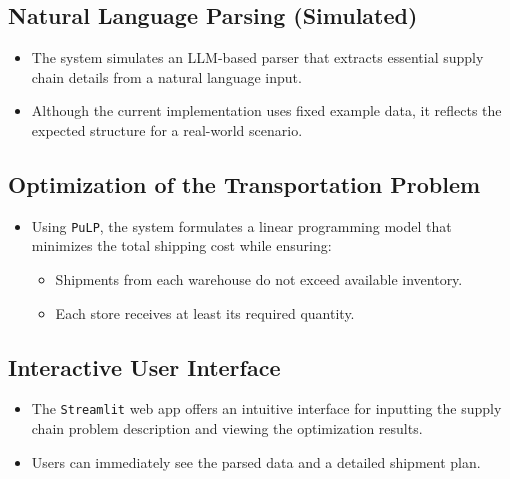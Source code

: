 \documentclass[11pt]{article}
\begin{document}
\subsection*{Natural Language Parsing (Simulated)}
\begin{itemize}
    \item The system simulates an LLM-based parser that extracts essential supply chain details from a natural language input.
    \item Although the current implementation uses fixed example data, it reflects the expected structure for a real-world scenario.
\end{itemize}

\subsection*{Optimization of the Transportation Problem}
\begin{itemize}
    \item Using \texttt{PuLP}, the system formulates a linear programming model that minimizes the total shipping cost while ensuring:
    \begin{itemize}
        \item Shipments from each warehouse do not exceed available inventory.
        \item Each store receives at least its required quantity.
    \end{itemize}
\end{itemize}

\subsection*{Interactive User Interface}
\begin{itemize}
    \item The \texttt{Streamlit} web app offers an intuitive interface for inputting the supply chain problem description and viewing the optimization results.
    \item Users can immediately see the parsed data and a detailed shipment plan.
\end{itemize}
\end{document}
